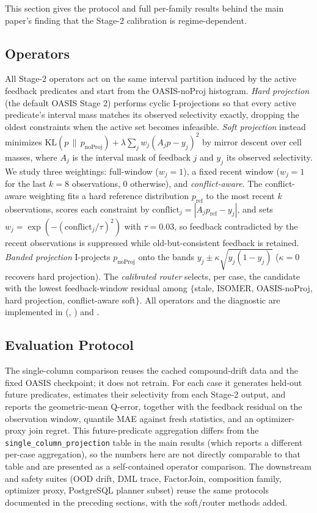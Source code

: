 \documentclass[runningheads]{llncs}
\begin{document}
This section gives the protocol and full per-family results behind the main
paper's finding that the Stage-2 calibration is regime-dependent.

\subsection{Operators}

All Stage-2 operators act on the same interval partition induced by the active
feedback predicates and start from the OASIS-noProj histogram. \emph{Hard
projection} (the default OASIS Stage 2) performs cyclic I-projections so that
every active predicate's interval mass matches its observed selectivity exactly,
dropping the oldest constraints when the active set becomes infeasible.
\emph{Soft projection} instead minimizes
$\mathrm{KL}(p\,\|\,p_{\text{noProj}}) + \lambda\sum_j w_j (A_j p - y_j)^2$ by
mirror descent over cell masses, where $A_j$ is the interval mask of feedback
$j$ and $y_j$ its observed selectivity. We study three weightings: full-window
($w_j{=}1$), a fixed recent window ($w_j{=}1$ for the last $k{=}8$ observations,
$0$ otherwise), and \emph{conflict-aware}. The conflict-aware weighting fits a
hard reference distribution $p_{\text{ref}}$ to the most recent $k$ observations,
scores each constraint by $\text{conflict}_j = |A_j p_{\text{ref}} - y_j|$, and
sets $w_j = \exp(-(\text{conflict}_j/\tau)^2)$ with $\tau{=}0.03$, so feedback
contradicted by the recent observations is suppressed while old-but-consistent
feedback is retained. \emph{Banded projection} I-projects $p_{\text{noProj}}$
onto the bands $y_j\pm\kappa\sqrt{y_j(1-y_j)}$ ($\kappa{=}0$ recovers hard
projection). The \emph{calibrated router} selects, per case, the candidate with
the lowest feedback-window residual among
$\{$stale, ISOMER, OASIS-noProj, hard projection, conflict-aware soft$\}$. All
operators and the diagnostic are implemented in
 (,
) and .

\subsection{Evaluation Protocol}

The single-column comparison reuses the cached compound-drift data and the fixed
OASIS checkpoint; it does not retrain. For each case it generates held-out future
predicates, estimates their selectivity from each Stage-2 output, and reports the
geometric-mean Q-error, together with the feedback residual on the observation
window, quantile MAE against fresh statistics, and an optimizer-proxy join
regret. This future-predicate aggregation differs from the
\texttt{single\_column\_projection} table in the main results (which reports a
different per-case aggregation), so the numbers here are not directly comparable
to that table and are presented as a self-contained operator comparison. The
downstream and safety suites (OOD drift, DML trace, FactorJoin, composition
family, optimizer proxy, PostgreSQL planner subset) reuse the same protocols
documented in the preceding sections, with the soft/router methods added.
\end{document}
